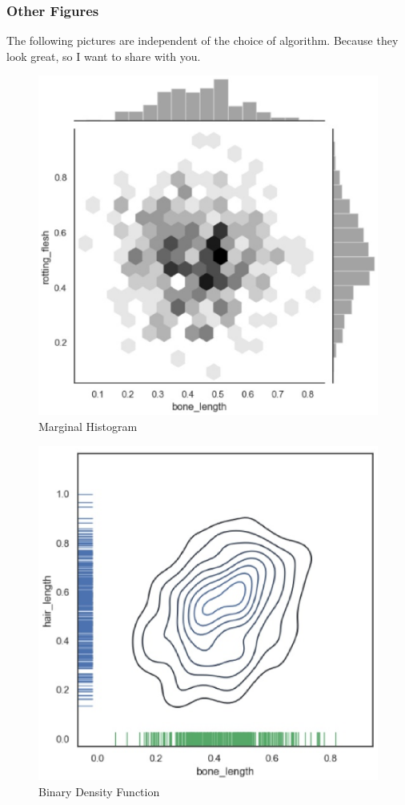 \subsubsection{Other Figures}
The following pictures are independent of the choice of algorithm. Because they look great, so I want to share with you.

\begin{figure}[h]\centering
	\includegraphics[scale=0.3]{figures/MHis.eps}
	\caption{Marginal Histogram}
\end{figure}

\begin{figure}[h]\centering
	\includegraphics[scale=0.3]{figures/BDF.eps}
	\caption{Binary Density Function}
\end{figure}


